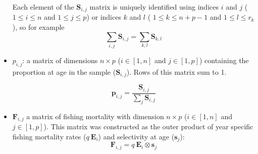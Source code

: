 \documentclass[12pt]{article}
\begin{document}
\begin{itemize}
\noindent Each element of the $\bm{S}_{i,j}$ matrix is uniquely identified using indices $i$ and $j$ ( $1 \leq i \leq n$ and $ 1 \leq j \leq p$) or indices $k$ and $l$ ( $ 1 \leq k \leq n+p-1 $ and $ 1 \leq l \leq r_{k}$ ), so for example
\begin{equation}
  \sum_{i,j} \bm{S}_{i,j} = \sum_{k,l} \bm{S}_{k,l}
\end{equation}

\item $p_{i,j}$: a matrix of dimensions $n \times p$ ($i \in [1, n]$ and $j \in [1, p]$) containing the proportion at age in the sample ($\bm{S}_{i,j}$). Rows of this matrix sum to 1.

\begin{equation}
\bm{p}_{i,j} = \frac{\bm{S}_{i,j}}{\sum_{j} \bm{S}_{i,j}}
\end{equation}

\item $\bm{F}_{i,j}$ a matrix of fishing mortality with dimension $n \times p$ ($i \in [1, n]$ and $j \in [1, p]$). This matrix was constructed as the outer product of year specific fishing mortality rates ($q \ \bm{E}_{i}$) and selectivity at age ($\bm{s}_{j}$):
\begin{equation}
\bm{F}_{i,j} = q \ \bm{E}_{i} \otimes \bm{s}_{j}
\end{equation}

\end{itemize}

\clearpage
\newpage

% 

\end{document}
